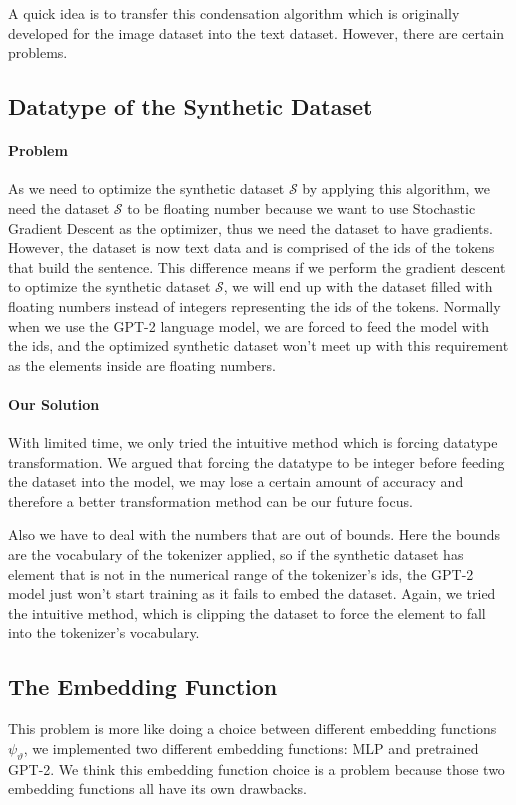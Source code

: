 \documentclass{article}
\begin{document}
A quick idea is to transfer this condensation algorithm which is originally developed for the image dataset into the text dataset. However, there are certain problems.


\subsection{Datatype of the Synthetic Dataset}
\paragraph{Problem} As we need to optimize the synthetic dataset $\mathcal{S}$ by applying this algorithm, we need the dataset $\mathcal{S}$ to be floating number because we want to use Stochastic Gradient Descent as the optimizer, thus we need the dataset to have gradients. However, the dataset is now text data and is comprised of the ids of the tokens that build the sentence. This difference means if we perform the gradient descent to optimize the synthetic dataset $\mathcal{S}$, we will end up with the dataset filled with floating numbers instead of integers representing the ids of the tokens. Normally when we use the GPT-2 language model, we are forced to feed the model with the ids, and the optimized synthetic dataset won't meet up with this requirement as the elements inside are floating numbers. 

\paragraph{Our Solution}
With limited time, we only tried the intuitive method which is forcing datatype transformation. We argued that forcing the datatype to be integer before feeding the dataset into the model, we may lose a certain amount of accuracy and therefore a better transformation method can be our future focus.  

Also we have to deal with the numbers that are out of bounds. Here the bounds are the vocabulary of the tokenizer applied, so if the synthetic dataset has element that is not in the numerical range of the tokenizer's ids, the GPT-2 model just won't start training as it fails to embed the dataset. Again, we tried the intuitive method, which is clipping the dataset to force the element to fall into the tokenizer's vocabulary. 


\subsection{The Embedding Function}
This problem is more like doing a choice between different embedding functions $\psi_{\vartheta}$, we implemented two different embedding functions: MLP and pretrained GPT-2. We think this embedding function choice is a problem because those two embedding functions all have its own drawbacks.
\end{document}
